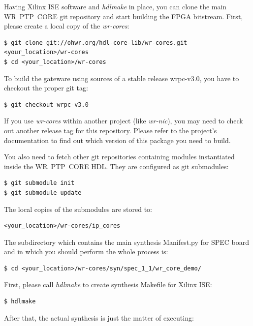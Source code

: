 \documentclass[a4paper, 12pt]{article}
\newcommand{\codeHook}[1]{\mbox{\ttfamily\MakeTextUppercase{#1}}}
\begin{document}
\vspace{1em}
Having Xilinx ISE software and \textit{hdlmake} in place, you can clone the main
\codeHook{wr ptp core} git repository and start building the FPGA bitstream.
First, please create a local copy of the \textit{wr-cores}:
\begin{lstlisting}
$ git clone git://ohwr.org/hdl-core-lib/wr-cores.git <your_location>/wr-cores
$ cd <your_location>/wr-cores
\end{lstlisting}

To build the gateware using sources of a stable release wrpc-v3.0, you
have to checkout the proper git tag:

\begin{lstlisting}
$ git checkout wrpc-v3.0
\end{lstlisting}

If you use \textit{wr-cores} within another project (like \textit{wr-nic}), you may need
to check out another release tag for this repository. Please refer to the
project's documentation to find out which version of this package you need to
build.

You also need to fetch other git repositories containing modules instantiated
inside the \codeHook{wr ptp core} HDL. They are configured as git submodules:
\begin{lstlisting}
$ git submodule init
$ git submodule update
\end{lstlisting}

The local copies of the submodules are stored to:

\begin{lstlisting}
<your_location>/wr-cores/ip_cores
\end{lstlisting}

\vspace{1em}
The subdirectory which contains the main synthesis Manifest.py for \codeHook{spec} board
and in which you should perform the whole process is:

\begin{lstlisting}
$ cd <your_location>/wr-cores/syn/spec_1_1/wr_core_demo/
\end{lstlisting}

First, please call \textit{hdlmake} to create synthesis Makefile for Xilinx
ISE:

\begin{lstlisting}
$ hdlmake
\end{lstlisting}

After that, the actual synthesis is just the matter of executing:
\end{document}
